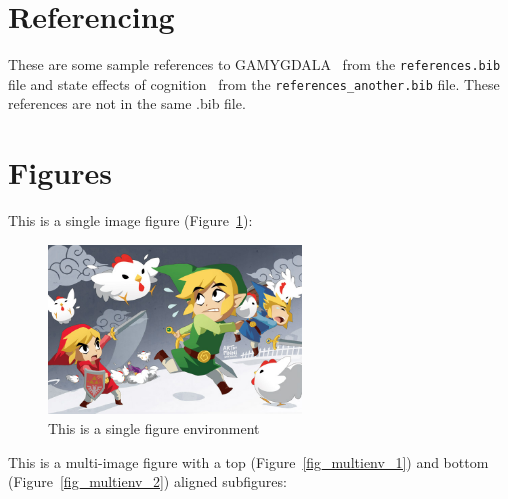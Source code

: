 \section{Referencing}
These are some sample references to GAMYGDALA~\citep{popescu2014gamygdala} from 
the \texttt{references.bib} file and state effects of 
cognition~\citep{hudlicka2002time} from the \texttt{references\_another.bib} 
file. These references are not in the same .bib file.

\section{Figures}
This is a single image figure (Figure~\ref{fig_singleenv}):

\begin{figure}[ht]
    \centering
    \includegraphics[width=0.6\textwidth]{figures/Sample/tumblr_static_eaceks0rfxsss8o4swscw40wo.jpg}
    \caption[Single Figure Environment Listed Title]{This is a single figure 
    environment}
    \label{fig_singleenv}
\end{figure}

This is a multi-image figure with a top (Figure~\ref{fig_multienv_1}) and bottom (Figure~\ref{fig_multienv_2}) aligned subfigures:

